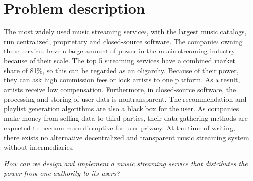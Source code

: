 \chapter{\label{chap:related-work}Problem description}
The most widely used music streaming services, with the largest music catalogs, run centralized, proprietary and closed-source software. The companies owning these services have a large amount of power in the music streaming industry because of their scale. The top 5 streaming services have a combined market share of 81\%, so this can be regarded as an oligarchy. Because of their power, they can ask high commission fees or lock artists to one platform. As a result, artists receive low compensation. Furthermore, in closed-source software, the processing and storing of user data is nontransparent. The recommendation and playlist generation algorithms are also a black box for the user. As companies make money from selling data to third parties, their data-gathering methods are expected to become more disruptive for user privacy. At the time of writing, there exists no alternative decentralized and transparent music streaming system without intermediaries.

\textit{How can we design and implement a music streaming service that distributes the power from one authority to its users?}%


